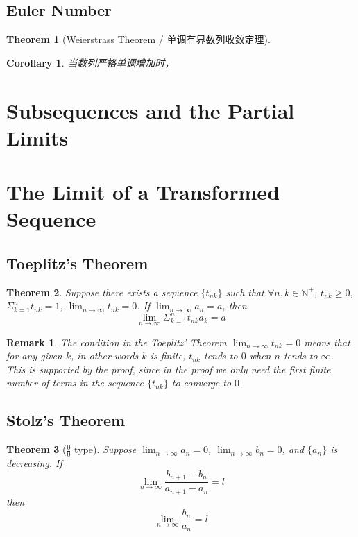 \documentclass[onecolumn]{ctexart}
\newtheorem{theorem}{Theorem}
\newtheorem{corollary}{Corollary}
\newtheorem{remark}{Remark}
\begin{document}
\subsection{Euler Number}

\begin{theorem}[Weierstrass Theorem / 单调有界数列收敛定理]
  
\end{theorem}

\begin{corollary}
  当数列严格单调增加时，
\end{corollary}

\section{Subsequences and the Partial Limits}

\section{The Limit of a Transformed Sequence}

\subsection{Toeplitz's Theorem}

\begin{theorem}
  Suppose there exists a sequence $\{t_{nk}\}$ such that 
  $\forall n, k \in \mathbb{N^+}$, $t_{nk} \geq 0$, $\Sigma_{k=1}^n t_{nk} = 1$, 
  $\lim_{n \to \infty} t_{nk} = 0$. If $\lim_{n \to \infty} a_n = a$, then 
  \[
    \lim_{n \to \infty} \Sigma_{k=1}^n t_{nk} a_k = a
  \]
\end{theorem}

\begin{remark}
  The condition in the Toeplitz' Theorem $\lim_{n \to \infty} t_{nk} = 0$ means 
  that for any given $k$, in other words $k$ is finite, $t_{nk}$ tends to $0$ 
  when $n$ tends to $\infty$. This is supported by the proof, since in the proof 
  we only need the first finite number of terms in the sequence $\{t_{nk}\}$ to 
  converge to $0$.
\end{remark}

\subsection{Stolz's Theorem}

\begin{theorem}[$\frac{0}{0}$ type]
  Suppose $\lim_{n \to \infty} a_n = 0$, $\lim_{n \to \infty} b_n = 0$, and 
  $\{a_n\}$ is decreasing. If 
  \[
    \lim_{n \to \infty} \frac{b_{n+1} - b_n}{a_{n+1} - a_n} = l
  \]
  then 
  \[
    \lim_{n \to \infty} \frac{b_n}{a_n} = l
  \]
\end{theorem}
\end{document}
